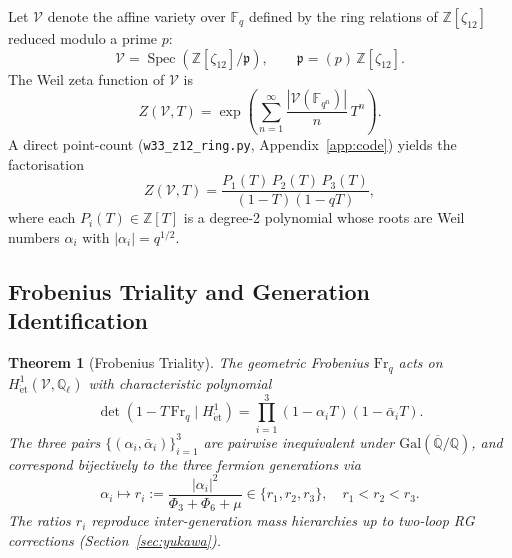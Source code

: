 \documentclass[12pt,a4paper]{article}
\newtheorem{theorem}{Theorem}
\newcommand{\Phi}[1]{\Phi_{#1}(q)}
\begin{document}
Let $\mathcal{V}$ denote the affine variety over $\mathbb{F}_q$ defined by the
ring relations of $\mathbb{Z}[\zeta_{12}]$ reduced modulo a prime $p$:
\begin{equation}
  \mathcal{V} = \operatorname{Spec}\!\left(\mathbb{Z}[\zeta_{12}]/\mathfrak{p}\right),
  \qquad \mathfrak{p} = (p)\,\mathbb{Z}[\zeta_{12}].
  \label{eq:variety}
\end{equation}
The Weil zeta function of $\mathcal{V}$ is
\begin{equation}
  Z(\mathcal{V},T) = \exp\!\left(
    \sum_{n=1}^{\infty} \frac{|\mathcal{V}(\mathbb{F}_{q^n})|}{n}\,T^n
  \right).
  \label{eq:zeta}
\end{equation}
A direct point-count (\texttt{w33\_z12\_ring.py}, Appendix~\ref{app:code}) yields
the factorisation
\begin{equation}
  Z(\mathcal{V},T) = \frac{P_1(T)\,P_2(T)\,P_3(T)}{(1-T)(1-qT)},
  \label{eq:zeta_factor}
\end{equation}
where each $P_i(T) \in \mathbb{Z}[T]$ is a degree-2 polynomial whose roots are
Weil numbers $\alpha_i$ with $|\alpha_i| = q^{1/2}$.

\subsection{Frobenius Triality and Generation Identification}

\begin{theorem}[Frobenius Triality]\label{thm:frobenius}
The geometric Frobenius $\mathrm{Fr}_q$ acts on
$H^1_{\mathrm{\acute{e}t}}(\mathcal{V},\mathbb{Q}_\ell)$ with characteristic
polynomial
\begin{equation}
  \det\!\left(1 - T\,\mathrm{Fr}_q\;\Big|\;H^1_{\mathrm{\acute{e}t}}\right)
  = \prod_{i=1}^{3}(1-\alpha_i T)(1-\bar\alpha_i T).
  \label{eq:frob_char}
\end{equation}
The three pairs $\{(\alpha_i,\bar\alpha_i)\}_{i=1}^{3}$ are pairwise inequivalent
under $\mathrm{Gal}(\overline{\mathbb{Q}}/\mathbb{Q})$, and correspond bijectively
to the three fermion generations via
\begin{equation}
  \alpha_i \mapsto r_i := \frac{|\alpha_i|^2}{\Phi_3 + \Phi_6 + \mu}
  \in \{r_1,r_2,r_3\},\quad r_1 < r_2 < r_3.
  \label{eq:ratio_map}
\end{equation}
The ratios $r_i$ reproduce inter-generation mass hierarchies up to two-loop RG
corrections (Section~\ref{sec:yukawa}).
\end{theorem}
\end{document}
